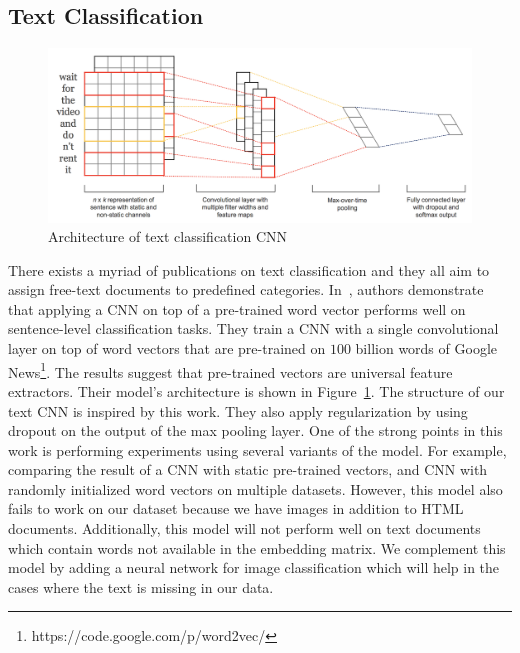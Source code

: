 \documentclass{article} %
\begin{document}
\subsection{Text Classification}
\begin{figure}
\centering
        \includegraphics[totalheight=3.5cm]{textnet.png}
    \caption{Architecture of text classification CNN \protect\cite{convtext}}
    \label{fig:textnet}
\end{figure}
There exists a myriad of publications on text classification and they all aim to assign free-text documents to predefined categories. In~\cite{convtext}, authors demonstrate that applying a CNN on top of a pre-trained word vector performs well on sentence-level classification tasks. They train a CNN with a single convolutional layer on top of word vectors that are pre-trained on $100$ billion words of Google News\footnote{https://code.google.com/p/word2vec/}. The results suggest that pre-trained vectors are universal feature extractors. Their model's architecture is shown in Figure~\ref{fig:textnet}. The structure of our text CNN is inspired by this work. They also apply regularization by using dropout on the output of the max pooling layer. One of the strong points in this work is performing experiments using several variants of the model. For example, comparing the result of a CNN with static pre-trained vectors, and CNN with randomly initialized word vectors on multiple datasets. However, this model also fails to work on our dataset because we have images in addition to HTML documents. Additionally, this model will not perform well on text documents which contain words not available in the embedding matrix. We complement this model by adding a neural network for image classification which will help in the cases where the text is missing in our data.
\end{document}
